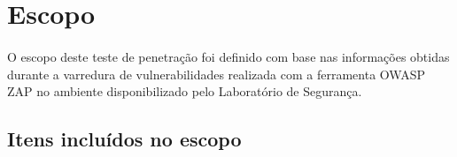 \section{Escopo}

\paragraph{}
O escopo deste teste de penetração foi definido com base nas informações
obtidas durante a varredura de vulnerabilidades realizada com a ferramenta
OWASP ZAP no ambiente disponibilizado pelo Laboratório de Segurança.

\subsection{Itens incluídos no escopo}

